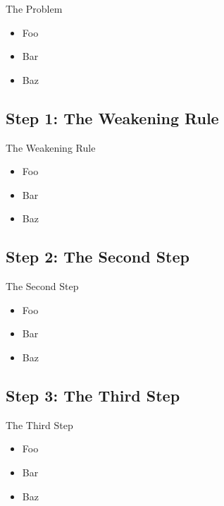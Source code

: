 \documentclass{beamer}
\begin{document}
\begin{frame}{The Problem}

  \begin{itemize}
    \item
      Foo
    \item
      Bar
    \item
      Baz
  \end{itemize}

\end{frame}


\subsection{Step 1: The Weakening Rule}

\begin{frame}{The Weakening Rule}

  \begin{itemize}
    \item
      Foo
    \item
      Bar
    \item
      Baz
  \end{itemize}

\end{frame}


\subsection{Step 2: The Second Step}

\begin{frame}{The Second Step}

  \begin{itemize}
    \item
      Foo
    \item
      Bar
    \item
      Baz
  \end{itemize}

\end{frame}


\subsection{Step 3: The Third Step}

\begin{frame}{The Third Step}

  \begin{itemize}
    \item
      Foo
    \item
      Bar
    \item
      Baz
  \end{itemize}

\end{frame}
\end{document}
